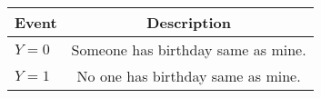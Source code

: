 \begin{tabular}{|l|c|}
	\hline
	\textbf{Event} & \textbf{Description} \\
	\hline
	$Y = 0$ &  Someone has birthday same as mine.\\
	\hline
	$Y = 1$ &  No one has birthday same as mine. \\
	\hline
	
\end{tabular}
